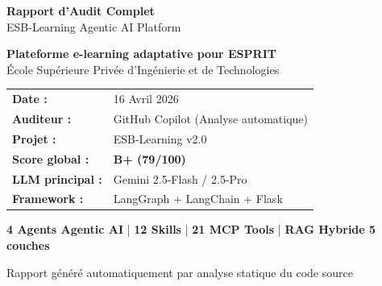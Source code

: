 \documentclass[12pt,a4paper]{article}
\begin{document}
\begin{titlepage}
  \centering
  \vspace*{1cm}

  {\Huge\bfseries\color{espritblue} Rapport d'Audit Complet}\\[0.5cm]
  {\LARGE\color{espritred} ESB-Learning Agentic AI Platform}\\[2cm]

  \begin{tcolorbox}[colback=espritblue!5,colframe=espritblue,width=12cm]
    \centering
    \textbf{Plateforme e-learning adaptative pour ESPRIT}\\
    École Supérieure Privée d'Ingénierie et de Technologies
  \end{tcolorbox}

  \vspace{2cm}

  \begin{tabular}{ll}
    \textbf{Date :}         & 16 Avril 2026 \\[4pt]
    \textbf{Auditeur :}     & GitHub Copilot (Analyse automatique) \\[4pt]
    \textbf{Projet :}       & ESB-Learning v2.0 \\[4pt]
    \textbf{Score global :} & \textcolor{agentgreen}{\textbf{B+ (79/100)}} \\[4pt]
    \textbf{LLM principal :}& Gemini 2.5-Flash / 2.5-Pro \\[4pt]
    \textbf{Framework :}    & LangGraph + LangChain + Flask \\
  \end{tabular}

  \vspace{2cm}

  \begin{tcolorbox}[colback=agentgreen!10,colframe=agentgreen]
    \centering
    \textbf{4 Agents Agentic AI} \quad|\quad
    \textbf{12 Skills} \quad|\quad
    \textbf{21 MCP Tools} \quad|\quad
    \textbf{RAG Hybride 5 couches}
  \end{tcolorbox}

  \vfill
  {\small\color{gray} Rapport généré automatiquement par analyse statique du code source}
\end{titlepage}

\tableofcontents
\newpage
\end{document}
